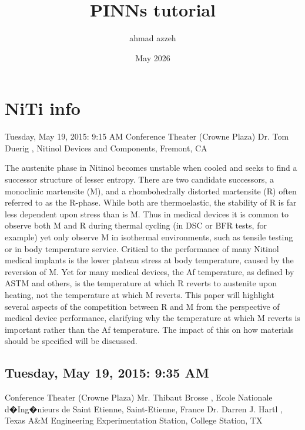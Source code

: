 \documentclass[12pt, a4paper]{article}
\title{PINNs tutorial}
\author{ahmad azzeh}
\date{May 2026}
\begin{document}
\section{ NiTi info}
Tuesday, May 19, 2015: 9:15 AM
Conference Theater (Crowne Plaza)
Dr. Tom Duerig , Nitinol Devices and Components, Fremont, CA


\noindent The austenite phase in Nitinol becomes unstable when cooled and seeks to find a successor structure of lesser entropy.   There are two candidate successors, a monoclinic martensite (M), and a rhombohedrally distorted martensite (R) often referred to as the R-phase.  While both are thermoelastic, the stability of R is far less dependent upon stress than is M.  Thus in medical devices it is common to observe both M and R during thermal cycling (in DSC or BFR tests, for example) yet only observe M in isothermal environments, such as tensile testing or in body temperature service.   Critical to the performance of many Nitinol medical implants is the lower plateau stress at body temperature, caused by the reversion of M.  Yet for many medical devices, the Af temperature, as defined by ASTM and others, is the temperature at which R reverts to austenite upon heating, not the temperature at which M reverts. 
This paper will highlight several aspects of the competition between R and M from the perspective of medical device performance, clarifying why the temperature at which M reverts is important rather than the Af temperature.  The impact of this on how materials should be specified will be discussed.
\subsection*{Tuesday, May 19, 2015: 9:35 AM}

Conference Theater (Crowne Plaza)
Mr. Thibaut Brosse , Ecole Nationale d�Ing�nieurs de Saint Etienne, Saint-Etienne, France
Dr. Darren J. Hartl , Texas A&M Engineering Experimentation Station, College Station, TX
\end{document}
